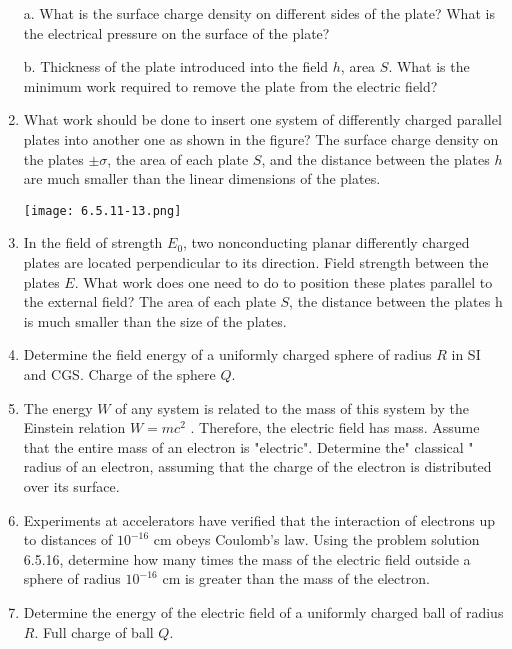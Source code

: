 \documentclass{article}
\begin{document}
\begin{enumerate}[label=6.5.\arabic*]
a. What is the surface charge density on different sides of the plate? What is the electrical pressure on the surface of the plate? 

b. Thickness of the plate introduced into the field $h$, area $S$. What is the minimum work required to remove the plate from the electric field?

\item What work should be done to insert one system of differently charged parallel plates into another one as shown in the figure? The surface charge density on the plates $\pm \sigma$, the area of each plate $S$, and the distance between the plates $h$ are much smaller than the linear dimensions of the plates.

\begin{center}
    \texttt{[image: 6.5.11-13.png]}
\end{center}

\item In the field of strength $E_0$, two nonconducting planar differently charged plates are located perpendicular to its direction. Field strength between the plates $E$. What work does one need to do to position these plates parallel to the external field? The area of each plate $S$, the distance between the plates h is much smaller than the size of the plates.

\item Determine the field energy of a uniformly charged sphere of radius $R$ in SI and CGS. Charge of the sphere $Q$.

\item The energy $W$ of any system is related to the mass of this system by the Einstein relation $W = mc^2$ . Therefore, the electric field has mass. Assume that the entire mass of an electron is "electric". Determine the" classical " radius of an electron, assuming that the charge of the electron is distributed over its surface.

\item Experiments at accelerators have verified that the interaction of electrons up to distances of $10^{-16}$ cm obeys Coulomb's law. Using the problem solution 6.5.16, determine how many times the mass of the electric field outside a sphere of radius $10^{-16}$ cm is greater than the mass of the electron.

\item Determine the energy of the electric field of a uniformly charged ball of radius $R$. Full charge of ball $Q$.


\end{enumerate}
\end{document}
